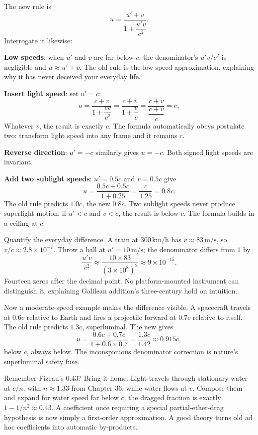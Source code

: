 The new rule is
\[
u=\frac{u'+v}{1+\dfrac{u'v}{c^{2}}}.
\]
Interrogate it likewise:

\textbf{Low speeds}: when \(u'\) and \(v\) are far below \(c\), the denominator's \(u'v/c^{2}\) is negligible and \(u\approx u'+v\). The old rule is the low-speed approximation, explaining why it has never deceived your everyday life.

\textbf{Insert light speed}: set \(u'=c\):
\[
u=\frac{c+v}{1+\dfrac{cv}{c^{2}}}=\frac{c+v}{1+\dfrac{v}{c}}
=\frac{c+v}{\dfrac{c+v}{c}}=c,
\]
Whatever \(v\), the result is exactly \(c\). The formula automatically obeys postulate two: transform light speed into any frame and it remains \(c\).

\textbf{Reverse direction}: \(u'=-c\) similarly gives \(u=-c\). Both signed light speeds are invariant.

\textbf{Add two sublight speeds}: \(u'=0.5c\) and \(v=0.5c\) give
\[
u=\frac{0.5c+0.5c}{1+0.25}=\frac{c}{1.25}=0.8c.
\]
The old rule predicts \(1.0c\), the new \(0.8c\). Two sublight speeds never produce superlight motion: if \(u'<c\) and \(v<c\), the result is below \(c\). The formula builds in a ceiling at \(c\).

Quantify the everyday difference. A train at \(300\,\mathrm{km/h}\) has \(v\approx83\,\mathrm{m/s}\), so \(v/c\approx2.8\times10^{-7}\). Throw a ball at \(u'=10\,\mathrm{m/s}\); the denominator differs from \(1\) by
\[
\frac{u'v}{c^{2}}\approx\frac{10\times83}{(3\times10^{8})^{2}}\approx9\times10^{-15}.
\]
Fourteen zeros after the decimal point. No platform-mounted instrument can distinguish it, explaining Galilean addition's three-century hold on intuition.

Now a moderate-speed example makes the difference visible. A spacecraft travels at \(0.6c\) relative to Earth and fires a projectile forward at \(0.7c\) relative to itself. The old rule predicts \(1.3c\), superluminal. The new gives
\[
u=\frac{0.6c+0.7c}{1+0.6\times0.7}=\frac{1.3c}{1.42}\approx0.915c,
\]
below \(c\), always below. The inconspicuous denominator correction is nature's superluminal safety fuse.

Remember Fizeau's \(0.43\)? Bring it home. Light travels through stationary water at \(c/n\), with \(n\approx1.33\) from Chapter 36, while water flows at \(v\). Compose them and expand for water speed far below \(c\); the dragged fraction is exactly \(1-1/n^{2}\approx0.43\). A coefficient once requiring a special partial-ether-drag hypothesis is now simply a first-order approximation. A good theory turns old ad hoc coefficients into automatic by-products.

